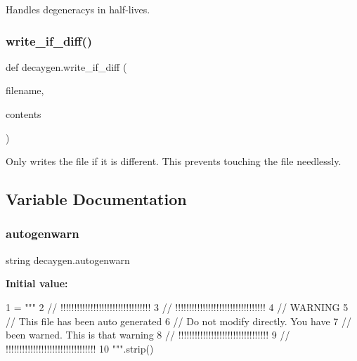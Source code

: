 \begin{DoxyVerb}Handles degeneracys in half-lives.\end{DoxyVerb}
 \mbox{\label{namespacedecaygen_ac625462eeb48e9518c0eb2af888b4fe2}} 
\subsubsection{\texorpdfstring{write\+\_\+if\+\_\+diff()}{write\_if\_diff()}}
{\footnotesize\ttfamily def decaygen.\+write\+\_\+if\+\_\+diff (\begin{DoxyParamCaption}\item[{}]{filename,  }\item[{}]{contents }\end{DoxyParamCaption})}

\begin{DoxyVerb}Only writes the file if it is different. This prevents touching the file needlessly.\end{DoxyVerb}
 

\subsection{Variable Documentation}
\mbox{\label{namespacedecaygen_a1f5d36fb20b4dda8ba0e121344b99bae}} 
\subsubsection{\texorpdfstring{autogenwarn}{autogenwarn}}
{\footnotesize\ttfamily string decaygen.\+autogenwarn}

{\bfseries Initial value\+:}
\begin{DoxyCode}
1 =  \textcolor{stringliteral}{"""}
2 \textcolor{stringliteral}{// !!!!!!!!!!!!!!!!!!!!!!!!!!!!!!!!!}
3 \textcolor{stringliteral}{// !!!!!!!!!!!!!!!!!!!!!!!!!!!!!!!!!}
4 \textcolor{stringliteral}{//              WARNING}
5 \textcolor{stringliteral}{// This file has been auto generated}
6 \textcolor{stringliteral}{// Do not modify directly. You have}
7 \textcolor{stringliteral}{// been warned. This is that warning}
8 \textcolor{stringliteral}{// !!!!!!!!!!!!!!!!!!!!!!!!!!!!!!!!!}
9 \textcolor{stringliteral}{// !!!!!!!!!!!!!!!!!!!!!!!!!!!!!!!!!}
10 \textcolor{stringliteral}{"""}.strip()
\end{DoxyCode}
